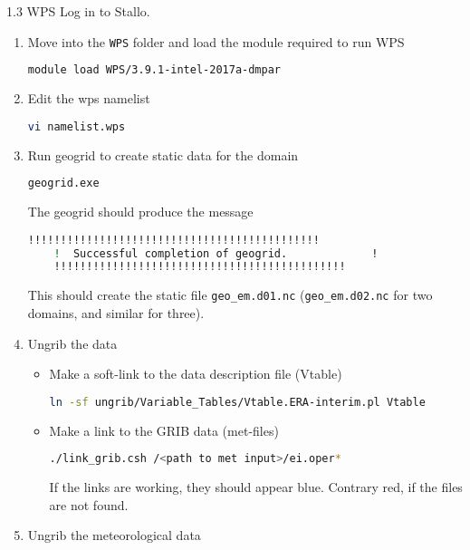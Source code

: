\documentclass[xcolor=table]{beamer}
\begin{document}
\begin{frame}[fragile, allowframebreaks=.95, t]{1.3 WPS}
Log in to Stallo.
\begin{enumerate}
	\item Move into the \texttt{WPS} folder and load the module required to run WPS
	\begin{lstlisting}[backgroundcolor = \color{light-gray}, language=bash]
	module load WPS/3.9.1-intel-2017a-dmpar
	\end{lstlisting}
	\item Edit the wps namelist
	\begin{lstlisting}[backgroundcolor = \color{light-gray}, language=bash]
	vi namelist.wps
	\end{lstlisting}
	\item Run geogrid to create static data for the domain
	\begin{lstlisting}[backgroundcolor = \color{light-gray}, language=bash]
	geogrid.exe
	\end{lstlisting}
	The geogrid should produce the message
	\begin{lstlisting}[backgroundcolor = \color{light-gray}, language=bash]
	!!!!!!!!!!!!!!!!!!!!!!!!!!!!!!!!!!!!!!!!!!!!!
	!  Successful completion of geogrid.             !
	!!!!!!!!!!!!!!!!!!!!!!!!!!!!!!!!!!!!!!!!!!!!!
	\end{lstlisting}
	This should create the static file \texttt{geo\_em.d01.nc} (\texttt{geo\_em.d02.nc} for two domains, and similar for three). 
	\item Ungrib the data 
	\begin{itemize}
	\item Make a soft-link to the data description file (Vtable)
	\begin{lstlisting}[backgroundcolor = \color{light-gray}, language=bash]
	ln -sf ungrib/Variable_Tables/Vtable.ERA-interim.pl Vtable
	\end{lstlisting}
	\item Make a link to the GRIB data (met-files)
	\begin{lstlisting}[backgroundcolor = \color{light-gray}, language=bash]
	./link_grib.csh /<path to met input>/ei.oper*
	\end{lstlisting}
	If the links are working, they should appear blue. Contrary red, if the files are not found.
	\end{itemize}
	\item Ungrib the meteorological data
	\begin{lstlisting}[backgroundcolor = \color{light-gray}, language=bash]

\end{lstlisting}
\end{enumerate}
\end{frame}
\end{document}
